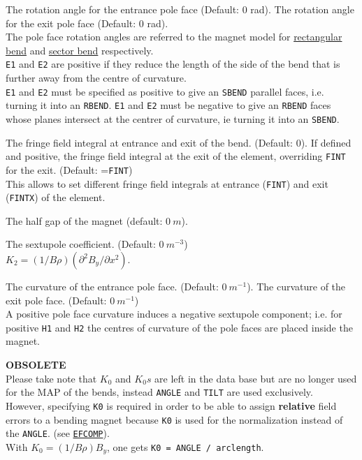 \begin{madlist}
    The rotation angle for the entrance pole face (Default: 0 rad). 
    The rotation angle for the exit pole face (Default: 0 rad). \\
   The pole face rotation angles are referred to the magnet model for
   \hyperref[F-RBND]{rectangular bend} and \hyperref[F-SBND]{sector
     bend} respectively. \\ 
   \texttt{E1} and \texttt{E2} are positive if they reduce the length of the
   side of the bend that is further away from the centre of
   curvature. \\
   \texttt{E1} and \texttt{E2} must be specified as positive to give an
   \texttt{SBEND} parallel faces, i.e. turning it into an
   \texttt{RBEND}. \texttt{E1} and \texttt{E2} must be negative to give
   an \texttt{RBEND} faces whose planes intersect at the centrer of
   curvature, ie turning it into an \texttt{SBEND}.   

    The fringe field integral at entrance and exit of the
   bend. (Default:  0). 
    If defined and positive, the fringe field integral at
   the exit of the element, overriding \texttt{FINT} for the
   exit. (Default: =\texttt{FINT}) \\  
   This allows to set different fringe field integrals at entrance
   (\texttt{FINT}) and exit (\texttt{FINTX}) of the element.  

    The half gap of the magnet (default: $0\ m$). 

    The sextupole coefficient. (Default: $0\ m^{-3}$) \\ 
   $K_2 = (1/B\rho) (\partial^2 B_y / \partial x^2)$.   

   The curvature of the entrance pole face. 
   (Default: $0\ m^{-1}$).   
    The curvature of the exit pole face. (Default: $0\ m^{-1}$) \\
   A positive pole face curvature induces a negative sextupole
   component; i.e. for positive \texttt{H1} and \texttt{H2} the centres
   of curvature of the pole faces are placed inside the magnet. 

    \textbf{OBSOLETE} \\
   Please take note that $K_0$ and $K_0s$ are left in the
   data base but are no longer used for the MAP of the bends,
   instead \texttt{ANGLE} and \texttt{TILT} are used exclusively. \\
   However, specifying \texttt{K0} is required in order to be able to
   assign \textbf{relative} field errors to a bending magnet because
   \texttt{K0} is used for the normalization instead of the
   \texttt{ANGLE}. (see \hyperref[sec:efcomp]{\texttt{EFCOMP}}).\\ 
   With $K_0 = (1 / B \rho) B_y$, one gets \texttt{K0 = ANGLE / arclength}.


\end{madlist}
